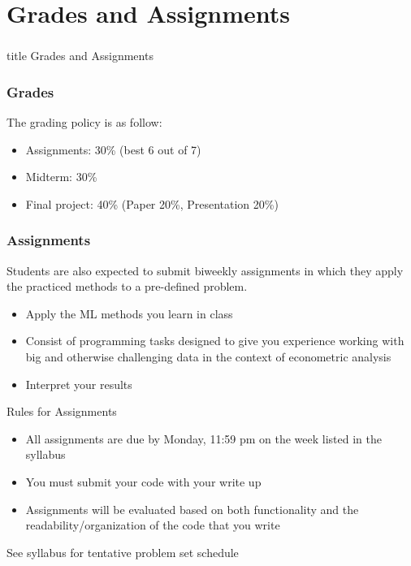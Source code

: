 \documentclass{beamer}
\begin{document}
\section{Grades and Assignments}
\label{grades}
\begin{frame}\frametitle{}
    \vfill
    \centering
    \begin{beamercolorbox}[center]{title}
        \Large Grades and Assignments
    \end{beamercolorbox}
    \vfill
\end{frame}

\begin{frame}\frametitle{Grades}
    The grading policy is as follow:
    \begin{itemize}
        \item Assignments: 30\% (best 6 out of 7)
        \item Midterm: 30\%
        \item Final project: 40\% (Paper 20\%, Presentation 20\%)
    
    \end{itemize}
    
\end{frame}

\begin{frame}\frametitle{Assignments}

 Students are also expected to submit biweekly assignments in which they apply the practiced methods to a pre-defined problem. 
 \begin{itemize}
        \item Apply the ML methods you learn in class
        \item Consist of programming tasks designed to give you experience working with big and otherwise challenging data in the context of econometric analysis
        \item Interpret your results
\end{itemize}
\vspace{2ex}

    Rules for Assignments
    \begin{itemize}
        \item All assignments are due by Monday, 11:59 pm on the week listed in the syllabus
        \item You must submit your code with your write up
        \item Assignments will be evaluated based on both functionality and the readability/organization of the code that you write
    \end{itemize}
    \vspace{2ex}
    See syllabus for tentative problem set schedule
\end{frame}
\end{document}
